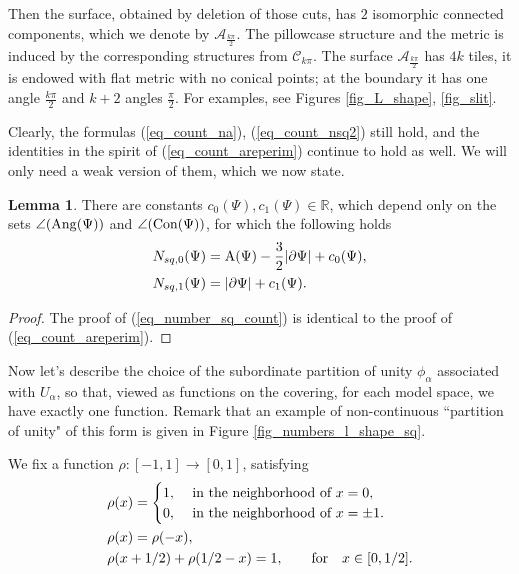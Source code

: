 \documentclass[12pt]{article}
\numberwithin{equation}{section}
\theoremstyle{theorem}
\theoremstyle{definition}
\newtheorem{lem}[thm]{Lemma}
\theoremstyle{remark}
\newcommand{\real}{\mathbb{R}}
\begin{document}
	Then the surface, obtained by deletion of those cuts, has $2$ isomorphic connected components, which we denote by $\mathcal{A}_{\frac{k \pi}{2}}$.
	The pillowcase structure and the metric is induced by the corresponding structures from $\mathcal{C}_{k \pi}$.
	The surface $\mathcal{A}_{\frac{k \pi}{2}}$ has $4k$ tiles, it is endowed with flat metric with no conical points; at the boundary it has one angle $\frac{k \pi}{2}$ and $k + 2$ angles $\frac{\pi}{2}$.
	For examples, see Figures \ref{fig_L_shape}, \ref{fig_slit}.
	\par 
	Clearly, the formulas (\ref{eq_count_na}), (\ref{eq_count_nsq2}) still hold, and the identities in the spirit of (\ref{eq_count_areperim}) continue to hold as well. 
	We will only need a weak version of them, which we now state. 
	\begin{lem}
		There are constants $c_0(\Psi), c_1(\Psi) \in \real$, which depend only on the sets $\angle({\rm{Ang}}(\Psi))$ and $\angle({\rm{Con}}(\Psi))$, for which the following holds
	\begin{equation}\label{eq_number_sq_count}
	\begin{aligned}
		&
		N_{sq, 0}(\Psi) = {\rm{A}}(\Psi) - \frac{3}{2} |\partial \Psi| + c_0(\Psi),
		\\
		&
		N_{sq, 1}(\Psi) = |\partial \Psi| + c_1(\Psi).
	\end{aligned}
	\end{equation}
	\end{lem}
	\begin{proof}
		The proof of (\ref{eq_number_sq_count}) is identical to the proof of (\ref{eq_count_areperim}).
	\end{proof}
	\par
	Now let's describe the choice of the subordinate partition of unity $\phi_{\alpha}$ associated with $U_{\alpha}$, so that, viewed as functions on the covering, for each model space, we have exactly one function.
	Remark that an example of non-continuous “partition of unity" of this form is given in Figure \ref{fig_numbers_l_shape_sq}.
	\par 
	We fix a function $\rho: [-1, 1] \to [0, 1]$, satisfying
	\begin{align}
		& \rho(x) = 
		\begin{cases} 
			\hfill 1, & \text{ in the neighborhood of $x = 0$}, \\
			\hfill 0, & \text{ in the neighborhood of $x = \pm 1$}.
 		\end{cases} 
 		\label{eq_rho1_rest1}
 		\\
 		& 
 		\rho(x) = \rho(-x),  
 		\label{eq_rho1_rest2}
 		\\
 		&
 		\rho(x + 1/2) + \rho(1/2 - x) = 1, \qquad \text{for} \quad x \in [0, 1/2].
 		\label{eq_rho1_rest3}
	\end{align}
\end{document}
